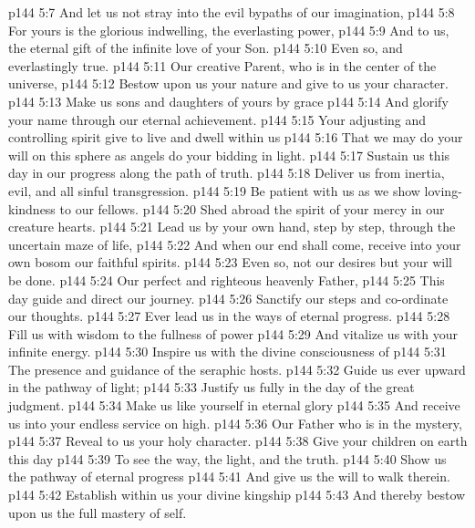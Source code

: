 \vs p144 5:7 \hsetoff And let us not stray into the evil bypaths of our imagination,
\vs p144 5:8 For yours is the glorious indwelling, the everlasting power,
\vs p144 5:9 \hsetoff And to us, the eternal gift of the infinite love of your Son.
\vs p144 5:10 Even so, and everlastingly true.
\separatorline
\vs p144 5:11 \pc Our creative Parent, who is in the center of the universe,
\vs p144 5:12 \hsetoff Bestow upon us your nature and give to us your character.
\vs p144 5:13 Make us sons and daughters of yours by grace
\vs p144 5:14 \hsetoff And glorify your name through our eternal achievement.
\vs p144 5:15 Your adjusting and controlling spirit give to live and dwell within us
\vs p144 5:16 \hsetoff That we may do your will on this sphere as angels do your bidding in light.
\vs p144 5:17 Sustain us this day in our progress along the path of truth.
\vs p144 5:18 \hsetoff Deliver us from inertia, evil, and all sinful transgression.
\vs p144 5:19 Be patient with us as we show loving\hyp{}kindness to our fellows.
\vs p144 5:20 \hsetoff Shed abroad the spirit of your mercy in our creature hearts.
\vs p144 5:21 Lead us by your own hand, step by step, through the uncertain maze of life,
\vs p144 5:22 \hsetoff And when our end shall come, receive into your own bosom our faithful spirits.
\vs p144 5:23 Even so, not our desires but your will be done.
\separatorline
\vs p144 5:24 Our perfect and righteous heavenly Father,
\vs p144 5:25 \hsetoff This day guide and direct our journey.
\vs p144 5:26 Sanctify our steps and co\hyp{}ordinate our thoughts.
\vs p144 5:27 \hsetoff Ever lead us in the ways of eternal progress.
\vs p144 5:28 Fill us with wisdom to the fullness of power
\vs p144 5:29 \hsetoff And vitalize us with your infinite energy.
\vs p144 5:30 Inspire us with the divine consciousness of
\vs p144 5:31 \hsetoff The presence and guidance of the seraphic hosts.
\vs p144 5:32 Guide us ever upward in the pathway of light;
\vs p144 5:33 \hsetoff Justify us fully in the day of the great judgment.
\vs p144 5:34 Make us like yourself in eternal glory
\vs p144 5:35 \hsetoff And receive us into your endless service on high.
\separatorline
\vs p144 5:36 Our Father who is in the mystery,
\vs p144 5:37 \hsetoff Reveal to us your holy character.
\vs p144 5:38 Give your children on earth this day
\vs p144 5:39 \hsetoff To see the way, the light, and the truth.
\vs p144 5:40 Show us the pathway of eternal progress
\vs p144 5:41 \hsetoff And give us the will to walk therein.
\vs p144 5:42 Establish within us your divine kingship
\vs p144 5:43 \hsetoff And thereby bestow upon us the full mastery of self.
